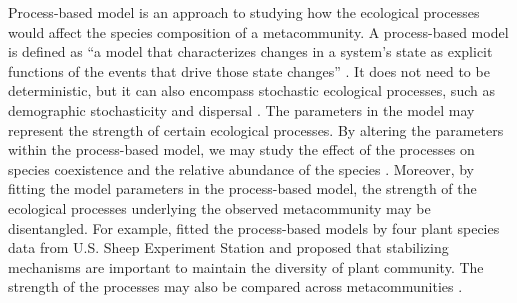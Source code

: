 	Process-based model is an approach to studying how the ecological processes would affect the species composition of a metacommunity. A process-based model is defined as “a model that characterizes changes in a system's state as explicit functions of the events that drive those state changes” \citep{connolly2017process}. It does not need to be deterministic, but it can also encompass stochastic ecological processes, such as demographic stochasticity and dispersal \citep{connolly2017process}. The parameters in the model may represent the strength of certain ecological processes. By altering the parameters within the process-based model, we may study the effect of the processes on species coexistence \citep{adler2007niche, adler2010coexistence} and the relative abundance of the species \citep{ke2015soil}. Moreover, by fitting the model parameters in the process-based model, the strength of the ecological processes underlying the observed metacommunity may be disentangled. For example, \citet{adler2010coexistence} fitted the process-based models by four plant species data from U.S. Sheep Experiment Station and proposed that stabilizing mechanisms are important to maintain the diversity of plant community. The strength of the processes may also be compared across metacommunities \citep{adler2018competition}.  
	
